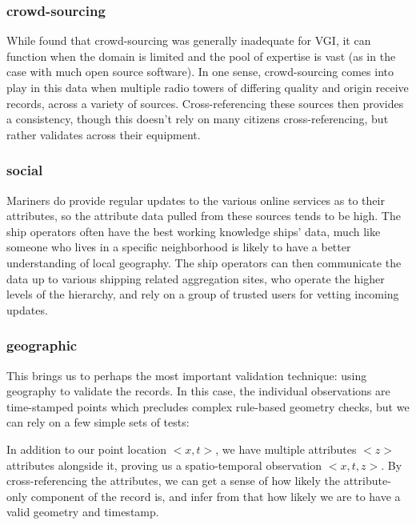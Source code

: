\subsubsection{crowd-sourcing}
While \citep{goodchildli2012} found that crowd-sourcing was generally inadequate for VGI, it can function when the domain is limited and the pool of expertise is vast (as in the case with much open source software). In one sense, crowd-sourcing comes into play in this data when multiple radio towers of differing quality and origin receive records, across a variety of sources. Cross-referencing these sources then provides a consistency, though this doesn't rely on many citizens cross-referencing, but rather validates across their equipment.

\subsubsection{social}
Mariners do provide regular updates to the various online services as to their attributes, so the attribute data pulled from these sources tends to be high. The ship operators often have the best working knowledge ships' data, much like someone who lives in a specific neighborhood is likely to have a better understanding of local geography. The ship operators can then communicate the data up to various shipping related aggregation sites, who operate the higher levels of the hierarchy, and rely on a group of trusted users for vetting incoming updates.

\subsubsection{geographic}
This brings us to perhaps the most important validation technique: using geography to validate the records. In this case, the individual observations are time-stamped points which precludes complex rule-based geometry checks, but we can rely on a few simple sets of tests:

In addition to our point location $<x,t>$, we have multiple attributes $<z>$ attributes alongside it, proving us a spatio-temporal observation $<x,t,z>$. By cross-referencing the attributes, we can get a sense of how likely the attribute-only component of the record is, and infer from that how likely we are to have a valid geometry and timestamp.

